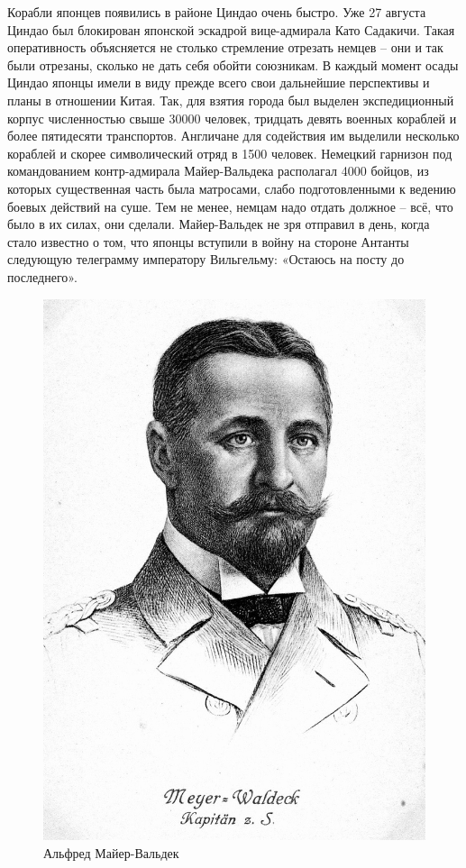 Корабли японцев появились в районе Циндао очень быстро. Уже 27 августа Циндао был блокирован японской эскадрой вице-адмирала Като Садакичи. Такая оперативность объясняется не столько стремление отрезать немцев – они и так были отрезаны, сколько не дать себя обойти союзникам. В каждый момент осады Циндао японцы имели в виду прежде всего свои дальнейшие перспективы и планы в отношении Китая. Так, для взятия города был выделен экспедиционный корпус численностью свыше 30000 человек, тридцать девять военных кораблей и более пятидесяти транспортов. Англичане для содействия им выделили несколько кораблей и скорее символический отряд в 1500 человек. Немецкий гарнизон под командованием контр-адмирала Майер-Вальдека располагал 4000 бойцов, из которых существенная часть была матросами, слабо подготовленными к ведению боевых действий на суше. Тем не менее, немцам надо отдать должное – всё, что было в их силах, они сделали. Майер-Вальдек не зря отправил в день, когда стало известно о том, что японцы вступили в войну на стороне Антанты следующую телеграмму императору Вильгельму: «Остаюсь на посту до последнего». 

\begin{figure}[h!tb] 
	\centering\includegraphics[scale=0.4]{Glava3/tCeondYExXg.jpg}
	\caption{Альфред Майер-Вальдек}%
\end{figure}

